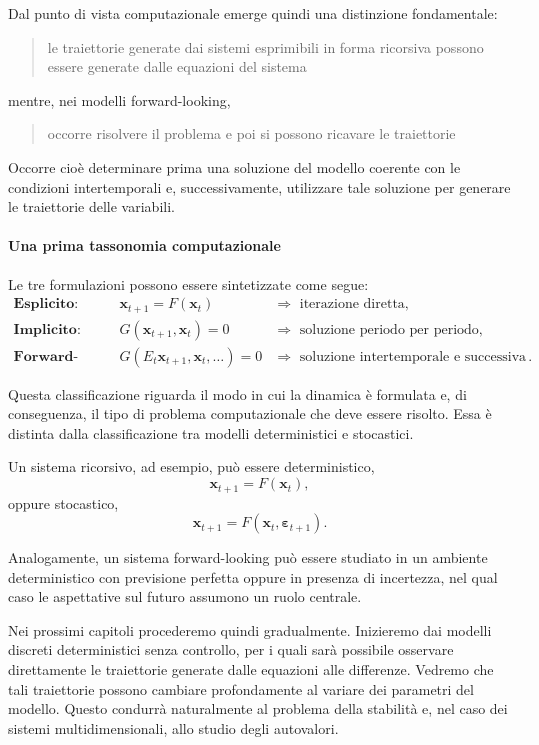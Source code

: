 \documentclass{book}
\begin{document}
Dal punto di vista computazionale emerge quindi una distinzione
fondamentale:
\begin{quotation}
	le traiettorie generate dai sistemi esprimibili in forma ricorsiva possono essere generate dalle equazioni del sistema
\end{quotation}
mentre, nei modelli forward-looking,

\begin{quotation}
	occorre risolvere il problema e poi si possono ricavare le traiettorie
\end{quotation}

Occorre cioè determinare prima una soluzione del modello coerente con
le condizioni intertemporali e, successivamente, utilizzare tale
soluzione per generare le traiettorie delle variabili.

\paragraph{Una prima tassonomia computazionale}

Le tre formulazioni possono essere sintetizzate come segue:
\[
\begin{array}{lll}
\textbf{Esplicito:}
&
\mathbf{x}_{t+1}=F(\mathbf{x}_t)
&
\Rightarrow \text{ iterazione diretta},
\\[2mm]
\textbf{Implicito:}
&
G(\mathbf{x}_{t+1},\mathbf{x}_t)=0
&
\Rightarrow \text{ soluzione periodo per periodo},
\\[2mm]
\textbf{Forward-looking:}
&
G(E_t\mathbf{x}_{t+1},\mathbf{x}_t,\ldots)=0
&
\Rightarrow \text{ soluzione intertemporale e successiva simulazione}.
\end{array}
\]

Questa classificazione riguarda il modo in cui la dinamica è
formulata e, di conseguenza, il tipo di problema computazionale che
deve essere risolto. Essa è distinta dalla classificazione tra modelli
deterministici e stocastici.

Un sistema ricorsivo, ad esempio, può essere deterministico,
\[
\mathbf{x}_{t+1}=F(\mathbf{x}_t),
\]
oppure stocastico,
\[
\mathbf{x}_{t+1}
=
F(\mathbf{x}_t,\boldsymbol{\varepsilon}_{t+1}).
\]

Analogamente, un sistema forward-looking può essere studiato in un
ambiente deterministico con previsione perfetta oppure in presenza di
incertezza, nel qual caso le aspettative sul futuro assumono un ruolo
centrale.

Nei prossimi capitoli procederemo quindi gradualmente. Inizieremo dai
modelli discreti deterministici senza controllo, per i quali sarà
possibile osservare direttamente le traiettorie generate dalle
equazioni alle differenze. Vedremo che tali traiettorie possono
cambiare profondamente al variare dei parametri del modello. Questo
condurrà naturalmente al problema della stabilità e, nel caso dei
sistemi multidimensionali, allo studio degli autovalori.
\end{document}

